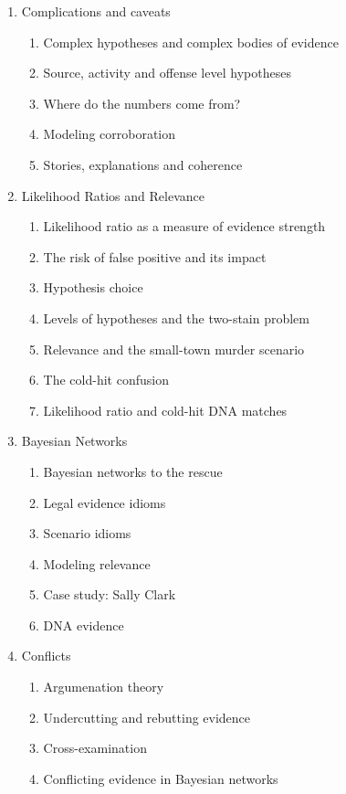 \documentclass[10pt,dvipsnames,enabledeprecatedfontcommands]{scrartcl}
\begin{document}
\begin{enumerate}
\begin{enumerate}
  
  
  \item  Complications and caveats
  \begin{enumerate}
  \item  Complex hypotheses and complex bodies of evidence
  \item Source, activity and offense level hypotheses
  \item  Where do the numbers come from?
  \item  Modeling corroboration
  \item  Stories, explanations and coherence
  \end{enumerate}

  
  \item  Likelihood Ratios and Relevance
  \begin{enumerate}
  \item Likelihood ratio as a measure of evidence strength
  \item The risk of false positive and its impact
  \item Hypothesis choice
  \item Levels of hypotheses and the two-stain problem
  \item Relevance and the small-town murder scenario
  \item The cold-hit confusion
  \item  Likelihood ratio and  cold-hit DNA matches
  \end{enumerate}



  \item  Bayesian Networks
  \begin{enumerate}
  \item  Bayesian networks to the rescue
  \item  Legal evidence idioms
  \item Scenario idioms
  \item Modeling relevance
  \item  Case study: Sally Clark
  \item DNA evidence
  \end{enumerate}
  
  \item Conflicts
  \begin{enumerate}
  \item Argumenation theory
  \item Undercutting and rebutting evidence
  \item Cross-examination
  \item Conflicting evidence in Bayesian networks
  \end{enumerate}
 

\end{enumerate}
\end{enumerate}
\end{document}
